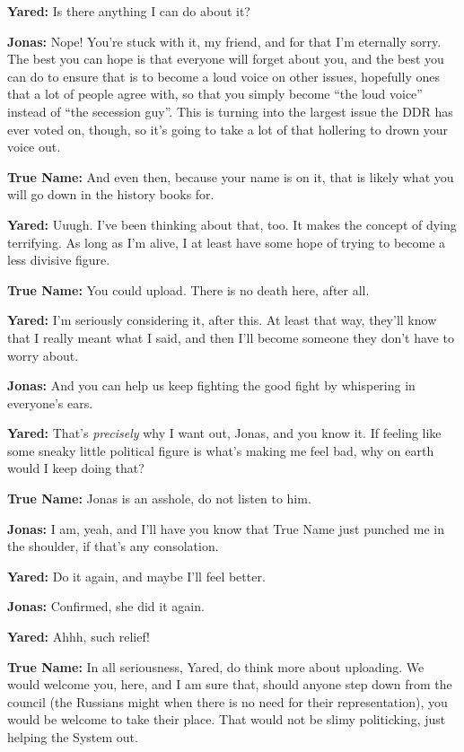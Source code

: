 \textbf{Yared:} Is there anything I can do about it?

\textbf{Jonas:} Nope! You're stuck with it, my friend, and for that I'm eternally sorry. The best you can hope is that everyone will forget about you, and the best you can do to ensure that is to become a loud voice on other issues, hopefully ones that a lot of people agree with, so that you simply become ``the loud voice'' instead of ``the secession guy''. This is turning into the largest issue the DDR has ever voted on, though, so it's going to take a lot of that hollering to drown your voice out.

\textbf{True Name:} And even then, because your name is on it, that is likely what you will go down in the history books for.

\textbf{Yared:} Uuugh. I've been thinking about that, too. It makes the concept of dying terrifying. As long as I'm alive, I at least have some hope of trying to become a less divisive figure.

\textbf{True Name:} You could upload. There is no death here, after all.

\textbf{Yared:} I'm seriously considering it, after this. At least that way, they'll know that I really meant what I said, and then I'll become someone they don't have to worry about.

\textbf{Jonas:} And you can help us keep fighting the good fight by whispering in everyone's ears.

\textbf{Yared:} That's \emph{precisely} why I want out, Jonas, and you know it. If feeling like some sneaky little political figure is what's making me feel bad, why on earth would I keep doing that?

\textbf{True Name:} Jonas is an asshole, do not listen to him.

\textbf{Jonas:} I am, yeah, and I'll have you know that True Name just punched me in the shoulder, if that's any consolation.

\textbf{Yared:} Do it again, and maybe I'll feel better.

\textbf{Jonas:} Confirmed, she did it again.

\textbf{Yared:} Ahhh, such relief!

\textbf{True Name:} In all seriousness, Yared, do think more about uploading. We would welcome you, here, and I am sure that, should anyone step down from the council (the Russians might when there is no need for their representation), you would be welcome to take their place. That would not be slimy politicking, just helping the System out.

